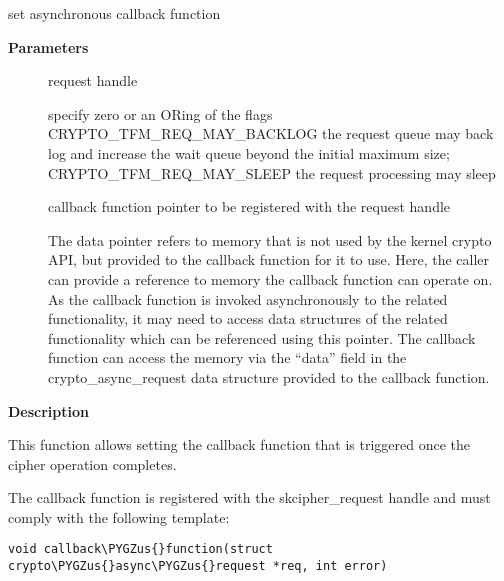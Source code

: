 \documentclass[a4paper,8pt,english]{sphinxmanual}
\def\PYGZus{\char`\_}
\begin{document}
\begin{fulllineitems}
\label{crypto/api-skcipher:c.skcipher_request_set_callback}
set asynchronous callback function

\end{fulllineitems}


\textbf{Parameters}
\begin{description}
\item[{}] \leavevmode
request handle

\item[{}] \leavevmode
specify zero or an ORing of the flags
CRYPTO\_TFM\_REQ\_MAY\_BACKLOG the request queue may back log and
increase the wait queue beyond the initial maximum size;
CRYPTO\_TFM\_REQ\_MAY\_SLEEP the request processing may sleep

\item[{}] \leavevmode
callback function pointer to be registered with the request handle

\item[{}] \leavevmode
The data pointer refers to memory that is not used by the kernel
crypto API, but provided to the callback function for it to use. Here,
the caller can provide a reference to memory the callback function can
operate on. As the callback function is invoked asynchronously to the
related functionality, it may need to access data structures of the
related functionality which can be referenced using this pointer. The
callback function can access the memory via the ``data'' field in the
crypto\_async\_request data structure provided to the callback function.

\end{description}

\textbf{Description}

This function allows setting the callback function that is triggered once the
cipher operation completes.

The callback function is registered with the skcipher\_request handle and
must comply with the following template:

\begin{Verbatim}[commandchars=\\\{\}]
void callback\PYGZus{}function(struct crypto\PYGZus{}async\PYGZus{}request *req, int error)
\end{Verbatim}
\end{document}
